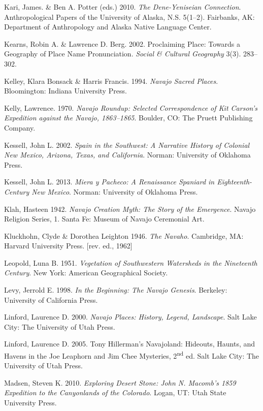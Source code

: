 Kari, James. \& Ben A. Potter (eds.)  2010. \textit{The Dene-Yeniseian Connection}.  Anthropological Papers of the University of Alaska, N.S. 5(1--2).  Fairbanks, AK:  Department of Anthropology and Alaska Native Language Center.

Kearns, Robin A. \& Lawrence D. Berg. 2002.  Proclaiming Place: Towards a Geography of Place Name Pronunciation.  \textit{Social \& Cultural Geography} 3(3). 283--302.

Kelley, Klara Bonsack \& Harris Francis. 1994. \textit{Navajo Sacred Places}.  Bloomington:  Indiana University Press.

Kelly, Lawrence. 1970. \textit{Navajo Roundup: Selected Correspondence of Kit Carson’s Expedition against the Navajo, 1863--1865}.  Boulder, CO:  The Pruett Publishing Company.

Kessell, John L.  2002. \textit{Spain in the Southwest: A Narrative History of Colonial New Mexico, Arizona, Texas, and California}.  Norman:  University of Oklahoma Press.



Kessell, John L.  2013. \textit{Miera y Pacheco: A Renaissance Spaniard in Eighteenth-Century New Mexico}.  Norman:  University of Oklahoma Press.

Klah, Hasteen  1942. \textit{Navajo Creation Myth: The Story of the Emergence}.  Navajo Religion Series, 1.  Santa Fe:  Museum of Navajo Ceremonial Art.

Kluckhohn, Clyde \& Dorothea Leighton  1946. \textit{The Navaho}.  Cambridge, MA:  Harvard University Press.  [rev. ed., 1962]

Leopold, Luna B.  1951. \textit{Vegetation of Southwestern Watersheds in the Nineteenth Century}.  New York:  American Geographical Society.

Levy, Jerrold E.  1998. \textit{In the Beginning: The Navajo Genesis}.  Berkeley:  University of California Press.

Linford, Laurence D.  2000. \textit{Navajo Places: History, Legend, Landscape}.  Salt Lake City:  The University of Utah Press.

Linford, Laurence D.  2005.  Tony Hillerman’s Navajoland: Hideouts, Haunts, and Havens in the Joe Leaphorn and Jim Chee\textit{ }Mysteries, 2\textsuperscript{nd} ed.  Salt Lake City:  The University of Utah Press.

Madsen, Steven K.  2010. \textit{Exploring Desert Stone: John N. Macomb’s 1859 Expedition to the Canyonlands of the Colorado}.  Logan, UT:  Utah State University Press.

